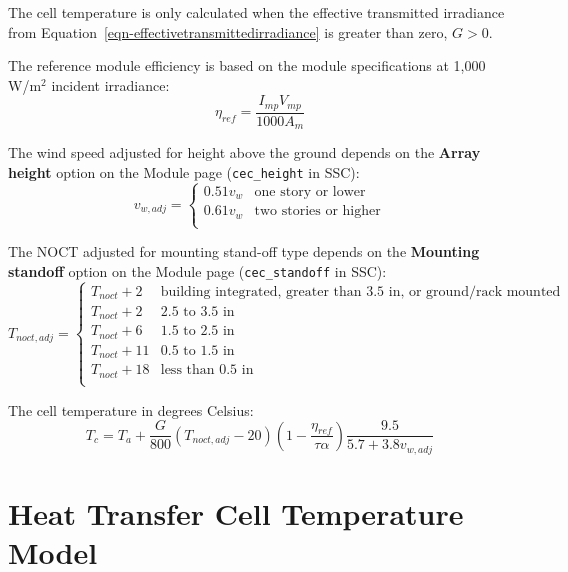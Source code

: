 \documentclass[12pt,letterpaper]{article}
\begin{document}
The cell temperature is only calculated when the effective transmitted irradiance from Equation~\ref{eqn-effectivetransmittedirradiance} is greater than zero, $G>0$.

The reference module efficiency is based on the module specifications at 1,000 W/m$^2$ incident irradiance:
\begin{equation}
\eta_{ref} = \frac{I_{mp} V_{mp}}{1000 A_m}
\end{equation}

The wind speed adjusted for height above the ground depends on the \textbf{Array height} option on the Module page (\texttt{cec\_height} in SSC):
\begin{equation}
v_{w,adj} = \left\{
\begin{array}{ll}
0.51 v_{w} & \text{one story or lower} \\
0.61 v_{w} & \text{two stories or higher} \\
\end{array}
\right.
\end{equation}

The NOCT adjusted for mounting stand-off type depends on the \textbf{Mounting standoff} option on the Module page (\texttt{cec\_standoff} in SSC):
\begin{equation}
T_{noct,adj} =\left\{
\begin{array}{ll}
T_{noct} + 2  & \text{building integrated, greater than 3.5 in, or ground/rack mounted}\\
T_{noct} + 2 & \text{2.5 to 3.5 in} \\
T_{noct} + 6 & \text{1.5 to 2.5 in} \\
T_{noct} + 11 & \text{0.5 to 1.5 in} \\
T_{noct} + 18 & \text{less than 0.5 in} \\
\end{array}
\right.
\end{equation}

The cell temperature in degrees Celsius:
\begin{equation}
T_c = T_a + \frac{G}{800} \left(T_{noct,adj} - 20 \right) \left(1-\frac{\eta_{ref}}{\tau \alpha}\right) \frac{9.5}{5.7+3.8v_{w,adj}}
\end{equation}

\section{Heat Transfer Cell Temperature Model}\label{sec-tcheattransfer}
\end{document}
